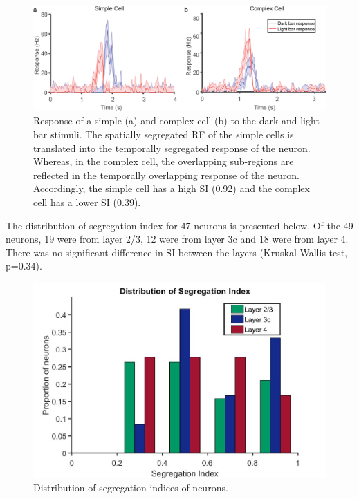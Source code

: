 		\begin{figure}[H]
		
		\includegraphics[width=\linewidth]{LinearV1/simplecomplex.jpg}
		\caption{Response of a simple (a) and complex cell (b) to the dark and light bar stimuli. The spatially segregated RF of the simple cells is translated into the temporally segregated response of the neuron. Whereas, in the complex cell, the overlapping sub-regions are reflected in the temporally overlapping response of the neuron. Accordingly, the simple cell has a high SI (0.92) and the complex cell has a lower SI (0.39).}
		\label{fig:fig2}
	\end{figure}
	
	The distribution of segregation index for 47 neurons is presented below. Of the 49 neurons, 19 were from layer 2/3, 12 were from layer 3c and 18 were from layer 4. There was no significant difference in SI between the layers (Kruskal-Wallis test, p=0.34).
	\begin{figure}[H]
		
		\includegraphics[width=\linewidth]{LinearV1/segregationindex_colouradj.jpg}
		\caption{Distribution of segregation indices of neurons.}
		\label{fig:fig3}
	\end{figure}

